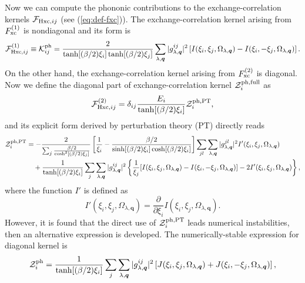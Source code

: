 Now we can compute the phononic contributions to the exchange-correlation kernels ${\mathcal F}_{{\rm Hxc},ij}$
(see (\ref{eq:def-fxc})).
The exchange-correlation kernel arising from $F^{(1)}_{\rm xc}$ is nondiagonal and its form is
%
\begin{equation}
	{\mathcal F}^{(1)}_{{\rm Hxc},ij}
	\equiv{\mathcal K}^{\rm ph}_{ij} = \frac{2}{\tanh[(\beta/2)\xi_i]\tanh[(\beta/2)\xi_j]}
	\sum_{\lambda, \bm q} |g^{ij}_{\lambda, \bm q}|^2
	\left[
		I(\xi_i, \xi_j, \Omega_{\lambda, \bm q}) - I(\xi_i, -\xi_j, \Omega_{\lambda, \bm q})
	\right].
	\label{eq:Kph}
\end{equation}
%
On the other hand, the exchange-correlation kernel arising from $F^{(2)}_{\rm xc}$ is diagonal.
Now we define the diagonal part of exchange-correlation kernel ${\mathcal Z}^{\rm ph, full}_i$ as
%
\begin{equation}
	{\mathcal F}^{(2)}_{{\rm Hxc},ij} = \delta_{ij}
	\frac{E_i}{\tanh[(\beta/2)\xi_i]}{\mathcal Z}^{\rm ph,PT}_i,
	\label{eq:FxcZphPT}
\end{equation}
and its explicit form derived by perturbation theory (PT) directly reads
%
\begin{equation}
\begin{split}
	\label{eq:ZphPT}
	{\mathcal Z}^{\rm ph, PT}_i &= - \frac{2}{\sum_{j} \frac{\beta/2}{\cosh^2[(\beta/2)\xi_j]}}
	\left[
		\frac{1}{\xi_i} - \frac{\beta/2}{\sinh[(\beta/2)\xi_i]\cosh[(\beta/2)\xi_i]}
	\right]
	\sum_{jl}\sum_{\lambda, \bm q} |g^{jl}_{\lambda, \bm q}|^2 I'(\xi_i, \xi_j, \Omega_{\lambda, \bm q}) \\
	&\quad + \frac{1}{\tanh[(\beta/2)\xi_i]}
	\sum_{j}\sum_{\lambda, \bm q} |g^{ij}_{\lambda, \bm q}|^2
	\left\{
		\frac{1}{\xi_j} [I(\xi_i, \xi_j, \Omega_{\lambda, \bm q}) - I(\xi_i, -\xi_j, \Omega_{\lambda, \bm q})]
		- 2I'(\xi_i, \xi_j, \Omega_{\lambda, \bm q})
	\right\},
\end{split}
\end{equation}
%
where the function $I'$ is defined as
%
\begin{equation}
	I'(\xi_i, \xi_j, \Omega_{\lambda, \bm q}) = 
	\frac{\partial}{\partial \xi_i} I(\xi_i, \xi_j, \Omega_{\lambda, \bm q}).
	\label{eq:Iprime}
\end{equation}
%
However, it is found that the direct use of ${\mathcal Z}^{\rm ph, PT}_i$ leads numerical instabilities\cite{Luders2005_1},
then an alternative expression is developed. The numerically-stable expression for diagonal kernel is 
%
\begin{equation}
	{\mathcal Z}^{\rm ph}_i = \frac{1}{\tanh[(\beta/2)\xi_i]}
	\sum_{j}\sum_{\lambda, \bm q} |g^{ij}_{\lambda, \bm q}|^2
	\left[
		J(\xi_i, \xi_j, \Omega_{\lambda, \bm q}) +
		J(\xi_i, -\xi_j, \Omega_{\lambda, \bm q})
	\right],
	\label{eq:Zphprac}
\end{equation}
